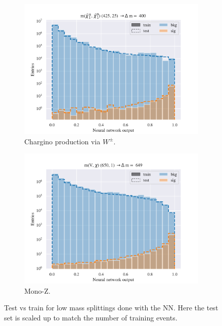 \begin{figure}[H]
    \begin{subfigure}[t!]{0.49\textwidth}
        \includegraphics[width = \textwidth]{Figures/WW/NN/All_level/High/scaled_train_test_395330.pdf}
        \caption{Chargino production via $W^\pm$.}
        \label{fig:WWNNLow}
    \end{subfigure}
    \begin{subfigure}[t!]{0.49\textwidth}
        \includegraphics[width = \textwidth]{Figures/Mono_Z/ML/NN/All_level/High/scaled_train_test_310617.pdf}
        \caption{Mono-Z.}
        \label{fig:MonoZNNLow}
    \end{subfigure}
    \caption{Test vs train for low mass splittings done with the NN. Here the test set is scaled up to match the number of training events.}
    \label{fig:AllLowNN}
\end{figure}






















